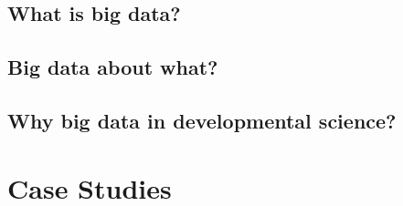 \documentclass[letterpaper,man,apacite]{apa6}
\begin{document}
 \subsection{What is big data?}


\subsection{Big data about what?}


\subsection{Why big data in developmental science?}

\section{Case Studies}
\end{document}
